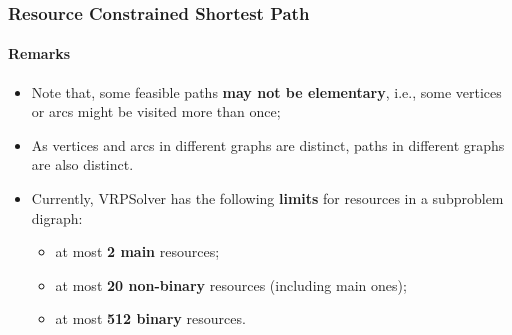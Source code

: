\begin{frame}
  \frametitle{Resource Constrained Shortest Path}
  \framesubtitle{Remarks}
  \begin{itemize}
    \item Note that, some feasible paths \textbf{may not be elementary}, i.e., some vertices or arcs might be visited more than once;
    \item As vertices and arcs in different graphs are distinct, paths in different graphs are also distinct.
    \item Currently, VRPSolver has the following \textbf{limits} for resources in a subproblem digraph:
      \begin{itemize}
        \item at most \textbf{2 main} resources;
        \item at most \textbf{20 non-binary} resources (including main ones);
        \item at most \textbf{512 binary} resources.
      \end{itemize}
  \end{itemize}
\end{frame}

